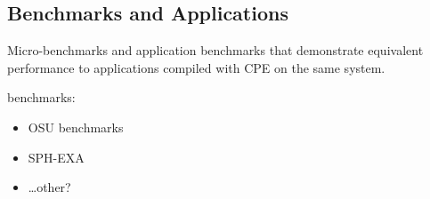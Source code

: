 \subsection{Benchmarks and Applications}


Micro-benchmarks and application benchmarks that demonstrate equivalent performance to applications compiled with CPE on the same system.


benchmarks:
\begin{itemize}
    \item OSU benchmarks 
    \item SPH-EXA 
    \item \dots other?
\end{itemize}

